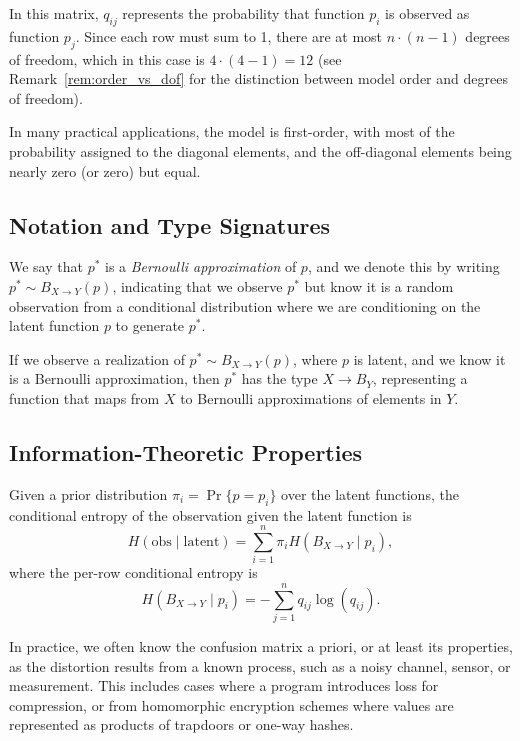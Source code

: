 \documentclass[../main.tex]{subfiles}
\begin{document}
In this matrix, $q_{ij}$ represents the probability that function $p_i$ is observed as function $p_j$. Since each row must sum to 1, there are at most $n \cdot (n-1)$ degrees of freedom, which in this case is $4 \cdot (4-1) = 12$ (see Remark~\ref{rem:order_vs_dof} for the distinction between model order and degrees of freedom).

In many practical applications, the model is first-order, with most of the probability assigned to the diagonal elements, and the off-diagonal elements being nearly zero (or zero) but equal.

\subsection{Notation and Type Signatures}

We say that $p^*$ is a \emph{Bernoulli approximation} of $p$, and we denote this by writing $p^* \sim B_{X \to Y}(p)$, indicating that we observe $p^*$ but know it is a random observation from a conditional distribution where we are conditioning on the latent function $p$ to generate $p^*$.

If we observe a realization of $p^* \sim B_{X \to Y}(p)$, where $p$ is latent, and we know it is a Bernoulli approximation, then $p^*$ has the type $X \to B_Y$, representing a function that maps from $X$ to Bernoulli approximations of elements in $Y$.

\subsection{Information-Theoretic Properties}

Given a prior distribution $\pi_i = \Pr\{p = p_i\}$ over the latent functions, the conditional entropy of the observation given the latent function is~\cite{coverThomas}
\begin{equation}
H(\text{obs} \mid \text{latent}) = \sum_{i=1}^n \pi_i H(B_{X \to Y} \mid p_i),
\end{equation}
where the per-row conditional entropy is
\begin{equation}
H(B_{X \to Y} \mid p_i) = -\sum_{j=1}^n q_{ij} \log(q_{ij}).
\end{equation}

In practice, we often know the confusion matrix a priori, or at least its properties, as the distortion results from a known process, such as a noisy channel, sensor, or measurement. This includes cases where a program introduces loss for compression, or from homomorphic encryption schemes where values are represented as products of trapdoors or one-way hashes.
\end{document}
